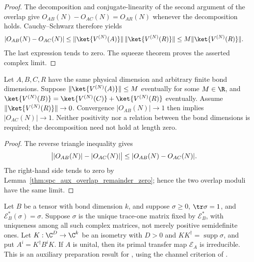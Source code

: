 \begin{proof}\leanok
    The decomposition and conjugate-linearity of the second argument of
    the overlap give $O_{AB}(N)-O_{AC}(N)=O_{AR}(N)$ whenever the
    decomposition holds. Cauchy--Schwarz therefore yields
    \begin{align}
        |O_{AB}(N)-O_{AC}(N)|
         & \leq \|\ket{V^{(N)}(A)}\|\,\|\ket{V^{(N)}(R)}\|
        \leq M\|\ket{V^{(N)}(R)}\|.\notag
    \end{align}
    The last expression tends to zero. The squeeze theorem proves the
    asserted complex limit.
\end{proof}

\begin{lemma}
    \label{thm:spc_aux_retained_overlap_one}
    \leanok
    Let $A,B,C,R$ have the same physical dimension and arbitrary finite
    bond dimensions. Suppose $\|\ket{V^{(N)}(A)}\|\leq M$ eventually
    for some $M\in\R$, and
    $\ket{V^{(N)}(B)}=\ket{V^{(N)}(C)}+\ket{V^{(N)}(R)}$ eventually.
    Assume $\|\ket{V^{(N)}(R)}\|\to0$.
    Convergence $|O_{AB}(N)|\to1$ then implies $|O_{AC}(N)|\to1$.
    Neither positivity nor a relation between the bond dimensions is
    required; the decomposition need not hold at length zero.
\end{lemma}

\begin{proof}\leanok
    The reverse triangle inequality gives
    \begin{align}
        \bigl||O_{AB}(N)|-|O_{AC}(N)|\bigr|
         & \leq|O_{AB}(N)-O_{AC}(N)|.\notag
    \end{align}
    The right-hand side tends to zero by
    Lemma~\ref{thm:spc_aux_overlap_remainder_zero}; hence the two overlap
    moduli have the same limit.
\end{proof}

\begin{lemma}
    \label{thm:spc_aux_supported_compression_irreducible}
    \leanok
    Let $B$ be a tensor with bond dimension $k$, and suppose
    $\sigma\geq0$, $\tr\sigma=1$, and $\mathcal E_B^*(\sigma)=\sigma$.
    Suppose $\sigma$ is the unique trace-one matrix fixed by
    $\mathcal E_B^*$, with uniqueness among all such complex matrices,
    not merely positive semidefinite ones.
    Let $K:\C^D\to\C^k$ be an isometry with $D>0$ and
    $KK^\dagger=\operatorname{supp}\sigma$, and put
    $A^i=K^\dagger B^iK$. If $A$ is unital, then its primal transfer
    map $\mathcal E_A$ is irreducible.
    This is an auxiliary preparation result for
    \cite[Appendix~C, lines~2653--2717]{Schuch2011Phases}, using the
    channel criterion of \cite[Theorem~6.3]{Wolf2012Quantum}.
\end{lemma}

